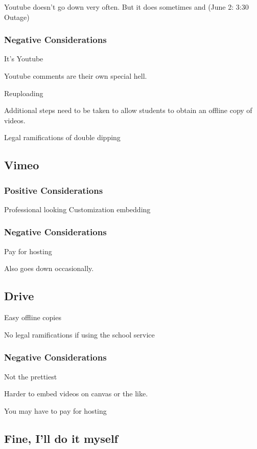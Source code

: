 \documentclass[sigconf]{acmart}
\begin{document}
Youtube doesn't go down very often.  But it does sometimes \cite{outage2018} and (June 2: 3:30 Outage) \cite{outage2019}

\subsubsection{Negative Considerations}

It's Youtube

Youtube comments are their own special hell.


Reuploading

Additional steps need to be taken to allow students to obtain an offline copy of videos.

Legal ramifications of double dipping


\subsection{Vimeo}

\subsubsection{Positive Considerations}
Professional looking
Customization embedding

\subsubsection{Negative Considerations}


Pay for hosting

Also goes down occasionally.

\subsection{Drive}

Easy offline copies

No legal ramifications if using the school service

\subsubsection{Negative Considerations}
Not the prettiest

Harder to embed videos on canvas or the like.

You may have to pay for hosting




\subsection{Fine, I'll do it myself}
\end{document}
